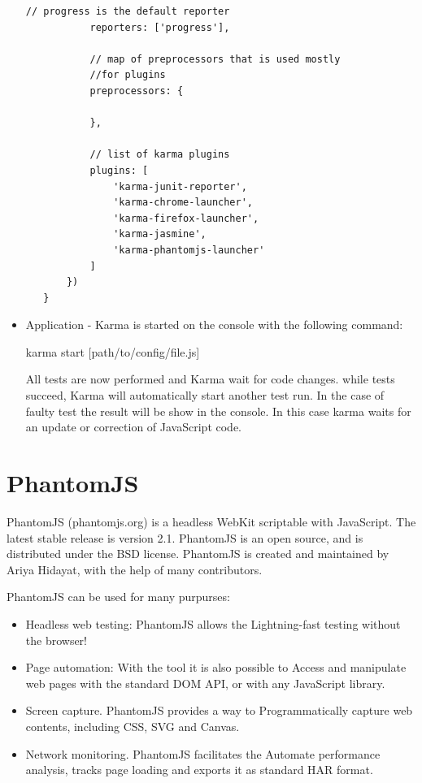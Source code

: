 \documentclass[11pt]{article}
\begin{document}
\begin{itemize}
\begin{lstlisting}[caption=Karma configuration file ]
           // progress is the default reporter  
           reporters: ['progress'],  
     
           // map of preprocessors that is used mostly   
           //for plugins  
           preprocessors: {  
     
           },  
     
           // list of karma plugins  
           plugins: [  
               'karma-junit-reporter',  
               'karma-chrome-launcher',  
               'karma-firefox-launcher',  
               'karma-jasmine',  
               'karma-phantomjs-launcher'  
           ]  
       })  
   }  
\end{lstlisting}

\item Application - Karma is started on the console with the following command:

\textdollar{} karma start [path/to/config/file.js]

All tests are now performed and Karma wait for code changes. while tests succeed, Karma will automatically start another test run. In the case of faulty test the result will be show in the console. In this case karma waits for an update or correction of JavaScript code.
\end{itemize}

\section{PhantomJS}

PhantomJS (phantomjs.org) is a headless WebKit scriptable with JavaScript. The latest stable release is version 2.1. PhantomJS is an open source, and is distributed under the BSD license. PhantomJS is created and maintained by Ariya Hidayat, with the help of many contributors.

PhantomJS can be used for many purpurses:

\begin{itemize}
\item Headless web testing: PhantomJS allows the Lightning-fast testing without the browser!
\item Page automation: With the tool it is also possible to Access and manipulate web pages with the standard DOM API, or with any JavaScript library.
\item Screen capture. PhantomJS provides a way to Programmatically capture web contents, including CSS, SVG and Canvas.
\item Network monitoring. PhantomJS facilitates the Automate performance analysis, tracks page loading and exports it as standard HAR format.
\end{itemize}
\end{document}

